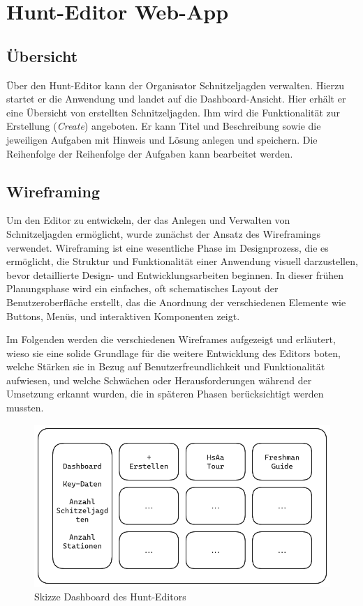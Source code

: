 \section{Hunt-Editor Web-App}

\subsection{Übersicht}

Über den Hunt-Editor kann der Organisator Schnitzeljagden verwalten. Hierzu startet er die Anwendung und landet auf die Dashboard-Ansicht. Hier erhält er eine Übersicht von erstellten Schnitzeljagden. Ihm wird die Funktionalität zur Erstellung (\textit{Create}) angeboten. Er kann Titel und Beschreibung sowie die jeweiligen Aufgaben mit Hinweis und Lösung anlegen und speichern. Die Reihenfolge der Reihenfolge der Aufgaben kann bearbeitet werden.

\subsection{Wireframing}

Um den Editor zu entwickeln, der das Anlegen und Verwalten von Schnitzeljagden ermöglicht, wurde zunächst der Ansatz des Wireframings verwendet. Wireframing ist eine wesentliche Phase im Designprozess, die es ermöglicht, die Struktur und Funktionalität einer Anwendung visuell darzustellen, bevor detaillierte Design- und Entwicklungsarbeiten beginnen. In dieser frühen Planungsphase wird ein einfaches, oft schematisches Layout der Benutzeroberfläche erstellt, das die Anordnung der verschiedenen Elemente wie Buttons, Menüs, und interaktiven Komponenten zeigt.

Im Folgenden werden die verschiedenen Wireframes aufgezeigt und erläutert, wieso sie eine solide Grundlage für die weitere Entwicklung des Editors boten, welche Stärken sie in Bezug auf Benutzerfreundlichkeit und Funktionalität aufwiesen, und welche Schwächen oder Herausforderungen während der Umsetzung erkannt wurden, die in späteren Phasen berücksichtigt werden mussten.

\begin{figure}[H]
  \centering
  \includegraphics[width=1\textwidth]{images/wireframing/PrAr_Scavhunt_Wireframing-2.1.png}
  \caption{Skizze Dashboard des Hunt-Editors}
  \label{fig:wireframing-frontend-hunt-editor-3}
\end{figure}

